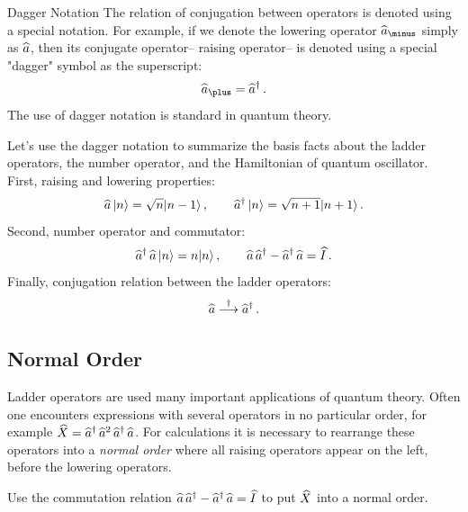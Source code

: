 \begin{mybio}{Dagger Notation}
	The relation of conjugation between operators is denoted using a special notation. For example, if we denote the lowering operator $\op{a}_\minus$ simply as $\widehat{a}$, then its conjugate operator-- raising operator-- is denoted using a special "dagger" symbol as the superscript:
	\[
	\op{a}_\plus = \op{a}^\dagger\,.
	\]
	The use of dagger notation is standard in quantum theory. 
	
	Let's use the dagger notation to summarize the basis facts about the ladder operators, the number operator, and the Hamiltonian of quantum oscillator.
	First, raising and lowering properties:
	\[
	\widehat{a}\,|{n}\rangle=\sqrt{n}|{n-1}\rangle\,,\qquad\widehat{a}^\dagger\,|{n}\rangle=\sqrt{n+1}|{n+1}\rangle\,.
	\]
	Second, number operator and commutator:
	\[
	\widehat{a}^\dagger\,\widehat{a}\,|{n}\rangle=n|{n}\rangle\,,\qquad \widehat{a}\,\widehat{a}^\dagger-\widehat{a}^\dagger\,\widehat{a}=\widehat{I}\,.
	\]
	Finally, conjugation relation between the ladder operators:
	\[
	\widehat{a}\overset{\dagger}{\longrightarrow}\widehat{a}^\dagger\,.
	\]
\end{mybio}
\subsection*{Normal Order}
\begin{exercise}
	Ladder operators are used many important applications of quantum theory. Often one encounters expressions with several operators in no particular order, for example $\widehat{X}=\widehat{a}^\dagger\,\widehat{a}^2\,\widehat{a}^\dagger\,\widehat{a}$. For calculations it is necessary to rearrange these operators into a \emph{normal order} where all raising operators appear on the left, before the lowering operators.
	
	Use the commutation relation $\widehat{a}\,\widehat{a}^\dagger-\widehat{a}^\dagger\,\widehat{a}=\widehat{I}$ to put $\widehat{X}$ into a normal order.
\end{exercise}



